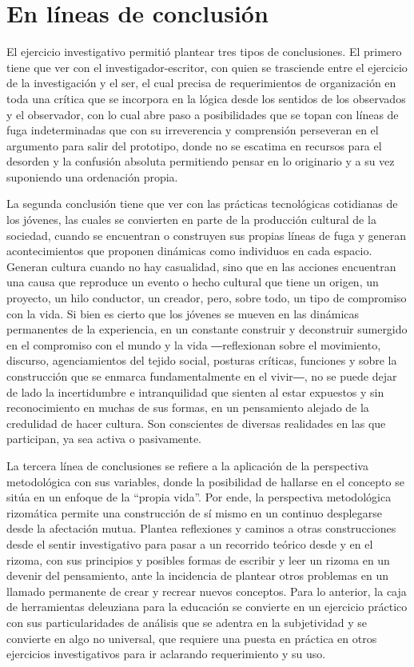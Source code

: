 \documentclass{textolivre}
\begin{document}
\section{En líneas de conclusión}\label{sec-conclusao}
El ejercicio investigativo permitió plantear tres tipos de conclusiones. El primero tiene que ver con el investigador-escritor, con quien se trasciende entre el ejercicio de la investigación y el ser, el cual precisa de requerimientos de organización en toda una crítica que se incorpora en la lógica desde los sentidos de los observados y el observador, con lo cual abre paso a posibilidades que se topan con líneas de fuga indeterminadas que con su irreverencia y comprensión perseveran en el argumento para salir del prototipo, donde no se escatima en recursos para el desorden y la confusión absoluta permitiendo pensar en lo originario y a su vez suponiendo una ordenación propia.

La segunda conclusión tiene que ver con las prácticas tecnológicas cotidianas de los jóvenes, las cuales se convierten en parte de la producción cultural de la sociedad, cuando se encuentran o construyen sus propias líneas de fuga y generan acontecimientos que proponen dinámicas como individuos en cada espacio. Generan cultura cuando no hay casualidad, sino que en las acciones encuentran una causa que reproduce un evento o hecho cultural que tiene un origen, un proyecto, un hilo conductor, un creador, pero, sobre todo, un tipo de compromiso con la vida. Si bien es cierto que los jóvenes se mueven en las dinámicas permanentes de la experiencia, en un constante construir y deconstruir sumergido en el compromiso con el mundo y la vida ―reflexionan sobre el movimiento, discurso, agenciamientos del tejido social, posturas críticas, funciones y sobre la construcción que se enmarca fundamentalmente en el vivir―, no se puede dejar de lado la incertidumbre e intranquilidad que sienten al estar expuestos y sin reconocimiento en muchas de sus formas, en un pensamiento alejado de la credulidad de hacer cultura. Son conscientes de diversas realidades en las que participan, ya sea activa o pasivamente.

La tercera línea de conclusiones se refiere a la aplicación de la perspectiva metodológica con sus variables, donde la posibilidad de hallarse en el concepto se sitúa en un enfoque de la “propia vida”. Por ende, la perspectiva metodológica rizomática permite una construcción de sí mismo en un continuo desplegarse desde la afectación mutua. Plantea reflexiones y caminos a otras construcciones desde el sentir investigativo para pasar a un recorrido teórico desde y en el rizoma, con sus principios y posibles formas de escribir y leer un rizoma en un devenir del pensamiento, ante la incidencia de plantear otros problemas en un llamado permanente de crear y recrear nuevos conceptos. Para lo anterior, la caja de herramientas deleuziana para la educación se convierte en un ejercicio práctico con sus particularidades de análisis que se adentra en la subjetividad y se convierte en algo no universal, que requiere una puesta en práctica en otros ejercicios investigativos para ir aclarando requerimiento y su uso. 


\printbibliography\label{sec-bib}
\end{document}
